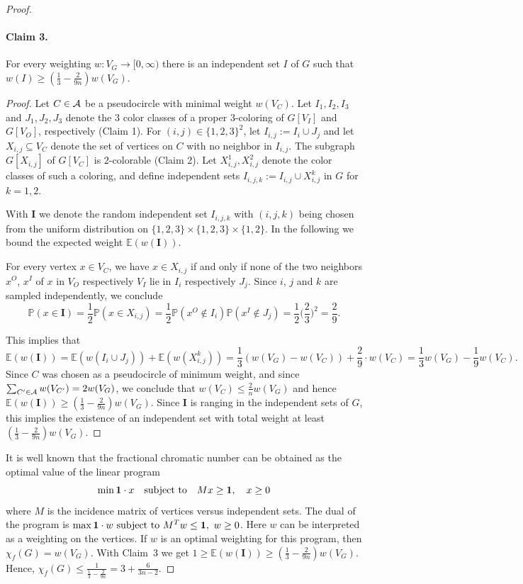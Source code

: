 \documentclass[fontsize=11pt,a4paper,DIV12]{scrartcl}
\def\AA{{\cal A}}
\begin{document}
\begin{proof}
\paragraph{Claim 3.}
For every weighting $w:V_G \rightarrow [0,\infty)$ there is an independent set
$I$ of $G$ such that $w(I) \ge (\frac{1}{3}-\frac{2}{9n})w(V_G)$.
\begin{proof}
  Let $C \in \AA$ be a pseudocircle with minimal weight $w(V_C)$.  Let
  $I_1, I_2, I_3$ and $J_1, J_2, J_3$ denote the $3$ color classes of a proper
  $3$-coloring of $G[V_I]$ and $G[V_O]$, respectively (Claim 1).  For
  $(i,j) \in \{1,2,3\}^2$, let $I_{i,j}:=I_i\cup J_j$ and let
  $X_{i,j} \subseteq V_C$ denote the set of vertices on $C$ with no neighbor
  in $I_{i,j}$. The subgraph $G[X_{i,j}]$ of $G[V_C]$ is $2$-colorable (Claim
  2). Let $X_{i,j}^1, X_{i,j}^2$ denote the color classes of such a coloring,
  and define independent sets $I_{i,j,k}:=I_{i,j} \cup X_{i,j}^k$ in $G$ for
  $k=1,2$.
	
  With $\textbf{I}$ we denote the random independent set $I_{i,j,k}$ with
  $(i,j,k)$ being chosen from the uniform distribution on
  $\{1,2,3\}\times\{1,2,3\}\times\{1,2\}$.  In the following we bound the
  expected weight $\mathbb{E}(w(\mathbf{I}))$.
	
  For every vertex $x \in V_C$, we have $x \in X_{i,j}$ if and only if none of
  the two neighbors $x^O$, $x^I$ of $x$ in $V_O$ respectively $V_I$ lie in
  $I_i$ respectively $J_j$. Since $i$, $j$ and $k$ are sampled independently,
  we conclude
  $$
  \mathbb{P}(x \in \mathbf{I}) = \frac{1}{2}\mathbb{P}(x \in X_{i,j})
  =\frac{1}{2}\mathbb{P}(x^O \notin I_i)\mathbb{P}(x^I \notin J_j)=
  \frac{1}{2}\Big(\frac{2}{3}\Big)^2=\frac{2}{9}.
  $$

  This implies that
  $$
  \mathbb{E}(w(\mathbf{I}))= \mathbb{E}(w(I_i \cup
  J_j))+\mathbb{E}(w(X_{i,j}^k)) =\frac{1}{3}(w(V_G)-w(V_C))+\frac{2}{9} \cdot
  w(V_C) =\frac{1}{3}w(V_G)-\frac{1}{9}w(V_C).
  $$
  Since $C$ was chosen as a pseudocircle of minimum weight, and since
  $\sum_{C' \in \AA}{w(V_{C'})}=2w(V_G)$, we conclude that
  $w(V_C) \le \frac{2}{n}w(V_G)$ and hence
  $\mathbb{E}(w(\mathbf{I})) \ge (\frac{1}{3}-\frac{2}{9n})w(V_G)$. Since
  $\mathbf{I}$ is ranging in the independent sets of $G$, this implies the
  existence of an independent set with total weight at least
  $(\frac{1}{3}-\frac{2}{9n})w(V_G)$.
\end{proof}

It is well known that the fractional chromatic number can be obtained as the
optimal value of the linear program
$$
\min \mathbf{1}\cdot x \hbox{\quad subject to\quad } Mx \geq \mathbf{1},
\quad x \geq 0
$$
where $M$ is the incidence matrix of vertices versus independent sets.  The
dual of the program is
$ \max \mathbf{1}\cdot w \hbox{ subject to } M^T w \leq \mathbf{1},\,\,w\geq
0$. Here $w$ can be interpreted as a weighting on the vertices. If $w$ is an
optimal weighting for this program, then $\chi_f(G) = w(V_G)$. With Claim~3 we
get	
$1 \geq \mathbb{E}(w(\mathbf{I})) \geq (\frac{1}{3}-\frac{2}{9n})w(V_G)$.
Hence, $\chi_f(G) \le \frac{1}{\frac{1}{3}-\frac{2}{9n}}=3+\frac{6}{3n-2}$.
\end{proof}
\end{document}
